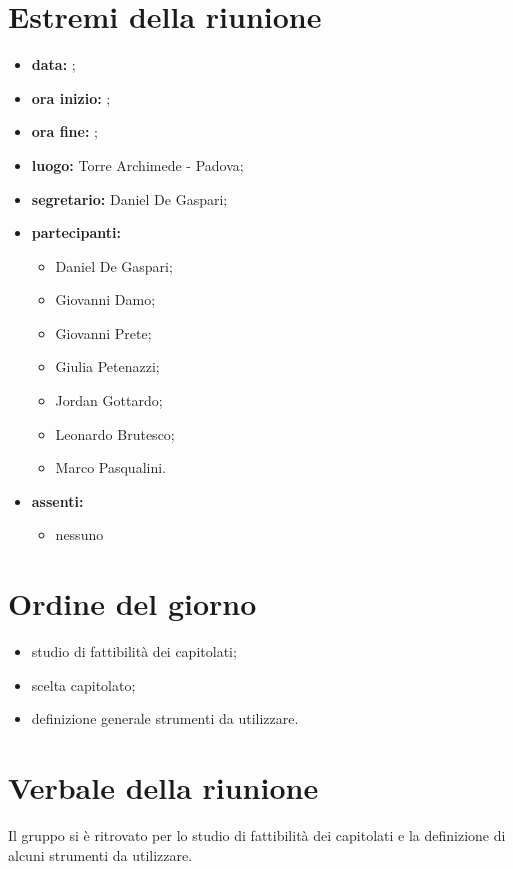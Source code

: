 \documentclass[a4paper,11pt]{article}
\begin{document}
	\section{Estremi della riunione}
	\begin{itemize}
		\item \textbf{data:} ;
		\item \textbf{ora inizio:} ;
		\item \textbf{ora fine:} ;
		\item \textbf{luogo:} Torre Archimede - Padova;
		\item \textbf{segretario:} Daniel De Gaspari;
		\item \textbf{partecipanti:}
			\begin{itemize}
			 \item Daniel De Gaspari;
			 \item Giovanni Damo;
			 \item Giovanni Prete;
			 \item Giulia Petenazzi;
			 \item Jordan Gottardo;
			 \item Leonardo Brutesco;
			 \item Marco Pasqualini.
			\end{itemize}
		\item \textbf{assenti:}
			\begin{itemize}
			 \item nessuno
			\end{itemize}
	\end{itemize}
	\section{Ordine del giorno}
		\begin{itemize}
			\item studio di fattibilità dei capitolati;
			\item scelta capitolato;
			\item definizione generale strumenti da utilizzare.
		\end{itemize}
	\section {Verbale della riunione}
	Il gruppo si è ritrovato per lo studio di fattibilità dei capitolati e la definizione di alcuni strumenti da utilizzare.
\end{document}
